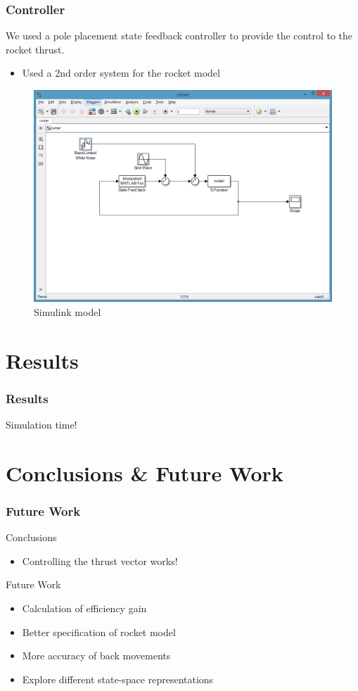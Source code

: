 \documentclass[dvipsnames,usenames]{beamer}
\begin{document}
\begin{frame}
\frametitle{Controller}
We used a pole placement state feedback controller to provide the
control to the rocket thrust.

\begin{itemize}
\item Used a 2nd order system for the rocket model
\end{itemize}
\begin{figure}
  \centering
  \includegraphics[width=.7\linewidth]{../figs/sim}
  \caption{Simulink model}
\end{figure}

\end{frame}

\section{Results}
\begin{frame}
  \frametitle{Results}
  Simulation time!
\end{frame}

\section{Conclusions \& Future Work}

\begin{frame}
\frametitle{Future Work}
Conclusions
\begin{itemize}
\item Controlling the thrust vector works! 
\end{itemize}

\vspace{1em}
Future Work
\begin{itemize}
\item Calculation of efficiency gain
\vspace{1em}
\item Better specification of rocket model
\vspace{1em}
\item More accuracy of back movements
\vspace{1em}
\item Explore different state-space representations
\end{itemize}
\end{frame}








% 
% 
\end{document}

